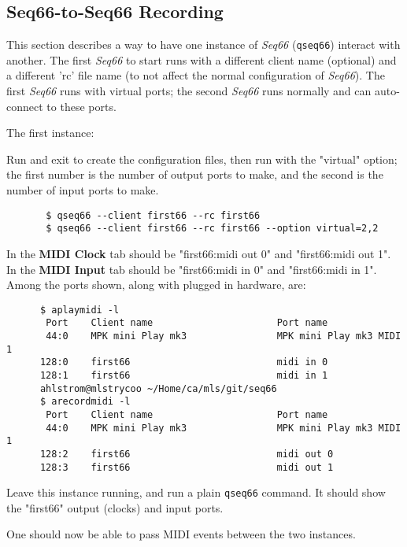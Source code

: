 \subsection{Seq66-to-Seq66 Recording}
\label{sec:recording_seq_to_seq}

   This section describes a way to have one instance of \textsl{Seq66}
   (\texttt{qseq66}) interact with another.
   The first \textsl{Seq66} to start runs with a different client name
   (optional) and a different 'rc' file name (to not affect the normal
   configuration of \textsl{Seq66}).
   The first \textsl{Seq66} runs with virtual ports; the second
   \textsl{Seq66} runs normally and can auto-connect to these
   ports.

   The first instance:

   Run and exit to create the configuration files, then run with
   the "virtual" option; the first number is the number of output ports
   to make, and the second is the number of input ports to make.

   \begin{verbatim}
       $ qseq66 --client first66 --rc first66
       $ qseq66 --client first66 --rc first66 --option virtual=2,2
   \end{verbatim}

   In the \textbf{MIDI Clock} tab should be "first66:midi out 0" and
   "first66:midi out 1".
   In the \textbf{MIDI Input} tab should be "first66:midi in 0" and
   "first66:midi in 1".
   Among the ports shown, along with plugged in hardware, are:

   \begin{verbatim}
      $ aplaymidi -l
       Port    Client name                      Port name
       44:0    MPK mini Play mk3                MPK mini Play mk3 MIDI 1
      128:0    first66                          midi in 0
      128:1    first66                          midi in 1
      ahlstrom@mlstrycoo ~/Home/ca/mls/git/seq66
      $ arecordmidi -l
       Port    Client name                      Port name
       44:0    MPK mini Play mk3                MPK mini Play mk3 MIDI 1
      128:2    first66                          midi out 0
      128:3    first66                          midi out 1
   \end{verbatim}

   Leave this instance running, and run a plain \texttt{qseq66} command.
   It should show the "first66" output (clocks) and input ports.

   One should now be able to pass MIDI events between the two instances.


